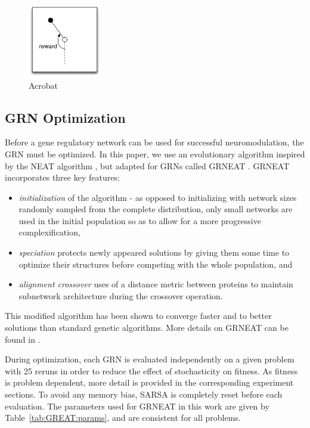 \begin{figure}[ht!]
\begin{minipage}[t]{0.19\linewidth}
\center
\includegraphics[height=3.2cm]{ACP_problem.pdf}
\caption{Acrobat
}\label{fig:ACP:problem}
\end{minipage}
\end{figure}

\subsection{GRN Optimization}
Before a gene regulatory network can be used for successful neuromodulation, the GRN must be optimized. In this paper, we use an evolutionary algorithm inspired by the NEAT algorithm \cite{stanley2002evolving}, but adapted for GRNs called GRNEAT \cite{cussatblanc2015grneat}. GRNEAT incorporates three key features:
\begin{itemize}
\item \emph{initialization} of the algorithm  - as opposed to initializing with network sizes randomly sampled from the complete distribution, only small networks are used in the initial population so as to allow for a more progressive complexification,
\item \emph{speciation} protects newly appeared solutions by giving them some time to optimize their structures before competing with the whole population, and
\item \emph{alignment crossover} uses of a distance metric between proteins to maintain subnetwork architecture during the crossover operation.
\end{itemize}
This modified algorithm has been shown to converge faster and to better solutions than standard genetic algorithms. More details on GRNEAT can be found in \cite{cussatblanc2015grneat}.

During optimization, each GRN is evaluated independently on a given problem with 25 reruns in order to reduce the effect of stochasticity on fitness. As fitness is problem dependent, more detail is provided in the corresponding experiment sections. To avoid any memory bias, SARSA is completely reset before each evaluation. The parameters used for GRNEAT in this work are given by Table~\ref{tab:GREAT:params}, and are consistent for all problems. 

